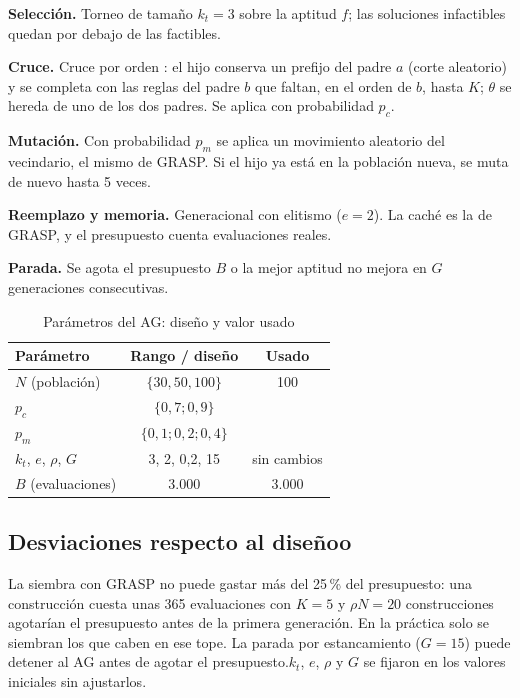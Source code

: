\documentclass[conference]{IEEEtran}
\begin{document}
	\textbf{Selecci\'on.} Torneo de tama\~no $k_t=3$ sobre la aptitud $f$; las soluciones infactibles quedan por debajo de las factibles.
	
	\textbf{Cruce.} Cruce por orden \cite{davis}: el hijo conserva un prefijo del padre $a$ (corte aleatorio) y se completa con las reglas del padre $b$ que faltan, en el orden de $b$, hasta $K$; $\theta$ se hereda de uno de los dos padres. Se aplica con probabilidad $p_c$.
	
	\textbf{Mutaci\'on.} Con probabilidad $p_m$ se aplica un movimiento aleatorio del vecindario, el mismo de GRASP. Si el hijo ya est\'a en la poblaci\'on nueva, se muta de nuevo hasta 5 veces.
	
	\textbf{Reemplazo y memoria.} Generacional con elitismo ($e=2$). La cach\'e es la de GRASP, y el presupuesto cuenta evaluaciones reales.
	
	\textbf{Parada.} Se agota el presupuesto $B$ o la mejor aptitud no mejora en $G$ generaciones consecutivas.
	
	\begin{table}[t]
		\centering
		\caption{Par\'ametros del AG: diseño y valor usado}
		\label{tab:params}
		\footnotesize
		\begin{tabular}{lcc}
			\toprule
			Par\'ametro & Rango / dise\~no & Usado \\
			\midrule
			$N$ (poblaci\'on) & $\{30,50,100\}$ & 100 \\
			$p_c$ & $\{0{,}7;0{,}9\}$ & \pcsel \\
			$p_m$ & $\{0{,}1;0{,}2;0{,}4\}$ & \pmsel \\
			$k_t$, $e$, $\rho$, $G$ & 3, 2, 0,2, 15 & sin cambios \\
			$B$ (evaluaciones) & 3.000 & 3.000 \\
			\bottomrule
		\end{tabular}
	\end{table}
	
	\subsection{Desviaciones respecto al diseñoo}
	La siembra con GRASP no puede gastar m\'as del 25\,\% del presupuesto: una construcci\'on cuesta unas 365 evaluaciones con $K=5$ y $\rho N=20$ construcciones agotar\'ian el presupuesto antes de la primera generaci\'on. En la pr\'actica solo se siembran los que caben en ese tope. La parada por estancamiento ($G=15$) puede detener al AG antes de agotar el presupuesto.$k_t$, $e$, $\rho$ y $G$ se fijaron en los valores iniciales sin ajustarlos.
	
\end{document}
